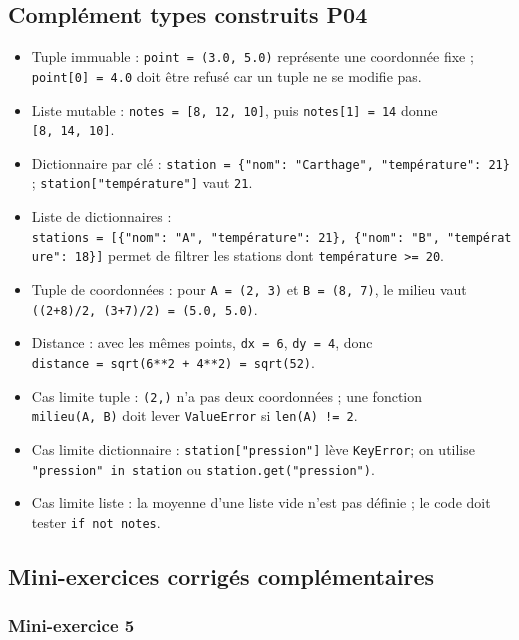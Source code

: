 \subsection{Complément types construits P04}

\begin{itemize}
\tightlist
\item
  Tuple immuable : \texttt{point\ =\ (3.0,\ 5.0)} représente une
  coordonnée fixe ; \texttt{point{[}0{]}\ =\ 4.0} doit être refusé car
  un tuple ne se modifie pas.
\item
  Liste mutable : \texttt{notes\ =\ {[}8,\ 12,\ 10{]}}, puis
  \texttt{notes{[}1{]}\ =\ 14} donne \texttt{{[}8,\ 14,\ 10{]}}.
\item
  Dictionnaire par clé :
  \texttt{station\ =\ \{"nom":\ "Carthage",\ "température":\ 21\}} ;
  \texttt{station{[}"température"{]}} vaut \texttt{21}.
\item
  Liste de dictionnaires :
  \texttt{stations\ =\ {[}\{"nom":\ "A",\ "température":\ 21\},\ \{"nom":\ "B",\ "température":\ 18\}{]}}
  permet de filtrer les stations dont
  \texttt{température\ \textgreater{}=\ 20}.
\item
  Tuple de coordonnées : pour \texttt{A\ =\ (2,\ 3)} et
  \texttt{B\ =\ (8,\ 7)}, le milieu vaut
  \texttt{((2+8)/2,\ (3+7)/2)\ =\ (5.0,\ 5.0)}.
\item
  Distance : avec les mêmes points, \texttt{dx\ =\ 6},
  \texttt{dy\ =\ 4}, donc
  \texttt{distance\ =\ sqrt(6**2\ +\ 4**2)\ =\ sqrt(52)}.
\item
  Cas limite tuple : \texttt{(2,)} n'a pas deux coordonnées ; une
  fonction \texttt{milieu(A,\ B)} doit lever \texttt{ValueError} si
  \texttt{len(A)\ !=\ 2}.
\item
  Cas limite dictionnaire : \texttt{station{[}"pression"{]}} lève
  \texttt{KeyError}; on utilise \texttt{"pression"\ in\ station} ou
  \texttt{station.get("pression")}.
\item
  Cas limite liste : la moyenne d'une liste vide n'est pas définie ; le
  code doit tester \texttt{if\ not\ notes}.
\end{itemize}

\subsection{Mini-exercices corrigés complémentaires}

\subsubsection{Mini-exercice 5}

